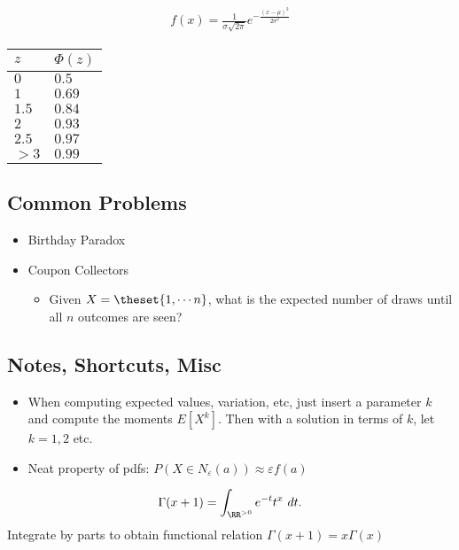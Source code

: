 \begin{align*}
f(x) = \frac{1}{\sigma \sqrt{2\pi}}e^{-\frac{(x-\mu)^2}{2\sigma^2}}
\end{align*}

\begin{longtable}[]{@{}ll@{}}
\toprule
\(z\) & \(\Phi(z)\)\tabularnewline
\midrule
\endhead
\(0\) & \(0.5\)\tabularnewline
\(1\) & \(0.69\)\tabularnewline
\(1.5\) & \(0.84\)\tabularnewline
\(2\) & \(0.93\)\tabularnewline
\(2.5\) & \(0.97\)\tabularnewline
\(>3\) & \(0.99\)\tabularnewline
\bottomrule
\end{longtable}

\hypertarget{common-problems}{%
\subsection{Common Problems}\label{common-problems}}

\begin{itemize}
\tightlist
\item
  Birthday Paradox
\item
  Coupon Collectors

  \begin{itemize}
  \tightlist
  \item
    Given \(X = \theset{1, \cdots n}\), what is the expected number of
    draws until all \(n\) outcomes are seen?
  \end{itemize}
\end{itemize}

\hypertarget{notes-shortcuts-misc}{%
\subsection{Notes, Shortcuts, Misc}\label{notes-shortcuts-misc}}

\begin{itemize}
\tightlist
\item
  When computing expected values, variation, etc, just insert a
  parameter \(k\) and compute the moments \(E[X^k]\). Then with a
  solution in terms of \(k\), let \(k=1,2\) etc.
\item
  Neat property of pdfs:
  \(P(X \in N_\varepsilon(a)) \approx \varepsilon f(a)\)
\end{itemize}

\begin{definition}

\begin{align*}  
\Gamma(x+1) = \int_{\RR^{>0}} e^{-t} t^x ~dt
.\end{align*} Integrate by parts to obtain functional relation
\(\Gamma(x+1) = x\Gamma(x)\)

\end{definition}

